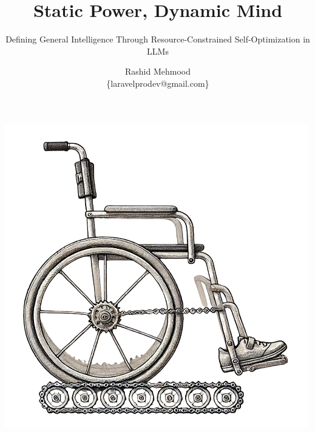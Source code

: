 \documentclass[11pt]{scrartcl}
\begin{document}
\title{Static Power, Dynamic Mind}
\subtitle{Defining General Intelligence Through Resource-Constrained Self-Optimization in LLMs}
\author{Rashid Mehmood \\ \{laravelprodev@gmail.com\} }

\maketitle

\includegraphics[scale=0.6, center]{title_wheelchair.png}

\vspace{3cm}
\end{document}
